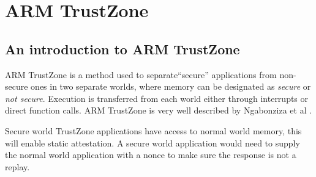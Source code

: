 \section{ARM TrustZone}

\subsection{An introduction to ARM TrustZone}

ARM TrustZone is a method used to separate``secure'' applications from non-secure ones in two separate worlds, where memory can be designated as \textit{secure} or \textit{not secure}. Execution is transferred from each world either through interrupts or direct function calls. ARM TrustZone is very well described by Ngabonziza et al \cite{Ngabonziza2017}.

Secure world TrustZone applications have access to normal world memory, this will enable static attestation. A secure world application would need to supply the normal world application with a nonce to make sure the response is not a replay.
